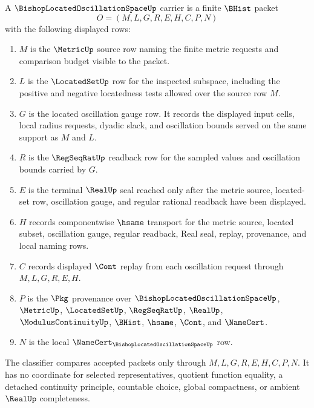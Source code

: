 \begin{definition}
\label{def:bishop-located-oscillation-space-carrier}
A $\BishopLocatedOscillationSpaceUp$ carrier is a finite $\BHist$ packet
$$
O=(M,L,G,R,E,H,C,P,N)
$$
with the following displayed rows:
\begin{enumerate}
\item $M$ is the $\MetricUp$ source row naming the finite metric requests and comparison budget visible to the packet.
\item $L$ is the $\LocatedSetUp$ row for the inspected subspace, including the positive and negative locatedness tests allowed over the source row $M$.
\item $G$ is the located oscillation gauge row. It records the displayed input cells, local radius requests, dyadic slack, and oscillation bounds served on the same support as $M$ and $L$.
\item $R$ is the $\RegSeqRatUp$ readback row for the sampled values and oscillation bounds carried by $G$.
\item $E$ is the terminal $\RealUp$ seal reached only after the metric source, located-set row, oscillation gauge, and regular rational readback have been displayed.
\item $H$ records componentwise $\hsame$ transport for the metric source, located subset, oscillation gauge, regular readback, Real seal, replay, provenance, and local naming rows.
\item $C$ records displayed $\Cont$ replay from each oscillation request through $M,L,G,R,E,H$.
\item $P$ is the $\Pkg$ provenance over $\BishopLocatedOscillationSpaceUp$, $\MetricUp$, $\LocatedSetUp$, $\RegSeqRatUp$, $\RealUp$, $\ModulusContinuityUp$, $\BHist$, $\hsame$, $\Cont$, and $\NameCert$.
\item $N$ is the local $\NameCert_{\BishopLocatedOscillationSpaceUp}$ row.
\end{enumerate}
The classifier compares accepted packets only through $M,L,G,R,E,H,C,P,N$. It has no coordinate for selected representatives, quotient function equality, a detached continuity principle, countable choice, global compactness, or ambient $\RealUp$ completeness.
\end{definition}


